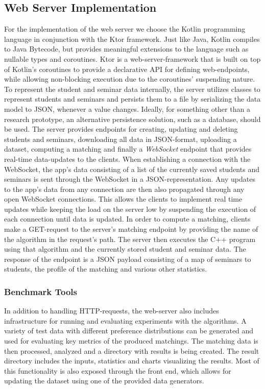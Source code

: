 \subsection{Web Server Implementation}
For the implementation of the web server we choose the Kotlin programming language in conjunction with the Ktor framework. Just like Java, Kotlin compiles to Java Bytecode, but provides meaningful extensions to the language such as nullable types and coroutines. Ktor is a web-server-framework that is built on top of Kotlin's coroutines to provide a declarative API for defining web-endpoints, while allowing non-blocking execution due to the coroutines' suspending nature. 
To represent the student and seminar data internally, the server utilizes classes to represent students and seminars and persists them to a file by serializing the data model to JSON, whenever a value changes. Ideally, for something other than a research prototype, an alternative persistence solution, such as a database, should be used. The server provides endpoints for creating, updating and deleting students and seminars, downloading all data in JSON-format, uploading a dataset, computing a matching and finally a \emph{WebSocket} endpoint that provides real-time data-updates to the clients. When establishing a connection with the WebSocket, the app's data consisting of a list of the currently saved students and seminars is sent through the WebSocket in a JSON-representation. Any updates to the app's data from any connection are then also propagated through any open WebSocket connections. This allows the clients to implement real time updates while keeping the load on the server low by suspending the execution of each connection until data is updated. In order to compute a matching, clients make a GET-request to the server's matching endpoint by providing the name of the algorithm in the request's path. The server then executes the C++ program using that algorithm and the currently stored student and seminar data. The response of the endpoint is a JSON payload consisting of a map of seminars to students, the profile of the matching and various other statistics.

\subsubsection{Benchmark Tools}
In addition to handling HTTP-requests, the web-server also includes infrastructure for running and evaluating experiments with the algorithms. A variety of test data with different preference distributions can be generated and used for evaluating key metrics of the produced matchings. The matching data is then processed, analyzed and a directory with results is being created. The result directory includes the inputs, statistics and charts visualizing the results. Most of this functionality is also exposed through the front end, which allows for updating the dataset using one of the provided data generators.

